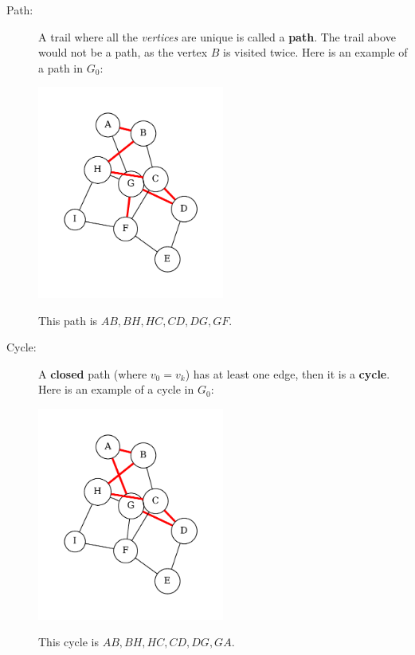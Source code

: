 \begin{description}
    \item[Path:] A trail where all the \emph{vertices} are unique is called a \textbf{path}. The trail above would not be a path, as the vertex $B$ is visited twice. Here is an example of a path in $G_0$:
    \begin{center}
        \includegraphics[width=0.5\textwidth]{Chapter2/path.pdf}
    \end{center}
    This path is $AB, BH, HC, CD, DG, GF$.
    \item[Cycle:] A \textbf{closed} path (where $v_0 = v_k$) has at least one edge, then it is a \textbf{cycle}. Here is an example of a cycle in $G_0$:
    \begin{center}
        \includegraphics[width=0.5\textwidth]{Chapter2/cycle.pdf}
    \end{center}
    This cycle is $AB, BH, HC, CD, DG, GA$.     
\end{description}
